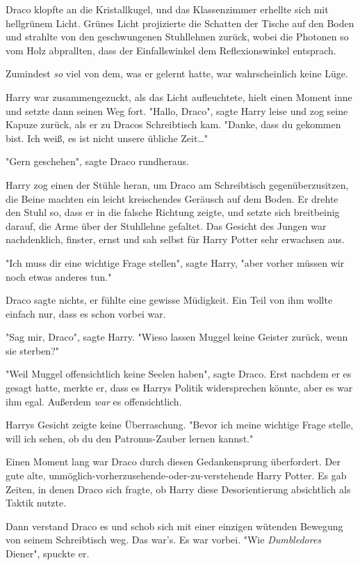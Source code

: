 {Draco klopfte an die Kristallkugel, und das Klassenzimmer erhellte sich mit hellgrünem Licht. Grünes Licht projizierte die Schatten der Tische auf den Boden und strahlte von den geschwungenen Stuhllehnen zurück, wobei die Photonen so vom Holz abprallten, dass der Einfallswinkel dem Reflexionswinkel entsprach.

Zumindest \emph{so} viel von dem, was er gelernt hatte, war wahrscheinlich keine Lüge.

Harry war zusammengezuckt, als das Licht aufleuchtete, hielt einen Moment inne und setzte dann seinen Weg fort. "Hallo, Draco", sagte Harry leise und zog seine Kapuze zurück, als er zu Dracos Schreibtisch kam. "Danke, dass du gekommen bist. Ich weiß, es ist nicht unsere übliche Zeit…"

"Gern geschehen", sagte Draco rundheraus.

Harry zog einen der Stühle heran, um Draco am Schreibtisch gegenüberzusitzen, die Beine machten ein leicht kreischendes Geräusch auf dem Boden. Er drehte den Stuhl so, dass er in die falsche Richtung zeigte, und setzte sich breitbeinig darauf, die Arme über der Stuhllehne gefaltet. Das Gesicht des Jungen war nachdenklich, finster, ernst und sah selbst für Harry Potter sehr erwachsen aus.

"Ich muss dir eine wichtige Frage stellen", sagte Harry, "aber vorher müssen wir noch etwas anderes tun."

Draco sagte nichts, er fühlte eine gewisse Müdigkeit. Ein Teil von ihm wollte einfach nur, dass es schon vorbei war.

"Sag mir, Draco", sagte Harry. "Wieso lassen Muggel keine Geister zurück, wenn sie sterben?"

"Weil Muggel offensichtlich keine Seelen haben", sagte Draco. Erst nachdem er es gesagt hatte, merkte er, dass es Harrys Politik widersprechen könnte, aber es war ihm egal. Außerdem \emph{war} es offensichtlich.

Harrys Gesicht zeigte keine Überraschung. "Bevor ich meine wichtige Frage stelle, will ich sehen, ob du den Patronus-Zauber lernen kannst."

Einen Moment lang war Draco durch diesen Gedankensprung überfordert. Der gute alte, unmöglich-vorherzusehende-oder-zu-verstehende Harry Potter. Es gab Zeiten, in denen Draco sich fragte, ob Harry diese Desorientierung absichtlich als Taktik nutzte.

Dann verstand Draco es und schob sich mit einer einzigen wütenden Bewegung von seinem Schreibtisch weg. Das war's. Es war vorbei. "Wie \emph{Dumbledores} Diener", spuckte er.

}
